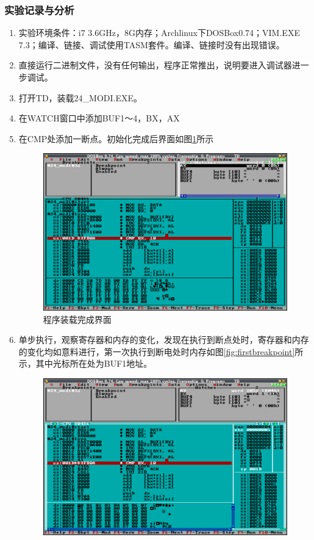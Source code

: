 \documentclass{article}
\begin{document}
	\subsubsection{实验记录与分析}
	\begin{enumerate}
		\item 实验环境条件：i7 3.6GHz，8G内存；Archlinux下DOSBox0.74；VIM.EXE 7.3；编译、链接、调试使用TASM套件。编译、链接时没有出现错误。
		\item 直接运行二进制文件，没有任何输出，程序正常推出，说明要进入调试器进一步调试。
		\item 打开TD，装载24\_MODI.EXE。
		\item 在WATCH窗口中添加BUF1～4，BX，AX
		\item 在CMP处添加一断点。初始化完成后界面如图\ref{fig:loadcomplete}所示
			\begin{figure}[H]
				\centering
				\includegraphics[width=0.8\linewidth]{res/homework_1/fig11.png}
				\caption{程序装载完成界面}
				\label{fig:loadcomplete}
			\end{figure}
		\item 单步执行，观察寄存器和内存的变化，发现在执行到断点处时，寄存器和内存的变化均如意料进行，第一次执行到断电处时内存如图\ref{fig:firstbreakpoint}所示，其中光标所在处为BUF1地址。
			\begin{figure}[H]
				\centering
				\includegraphics[width=0.8\linewidth]{res/homework_1/fig12.png}

\end{figure}
\end{enumerate}
\end{document}
